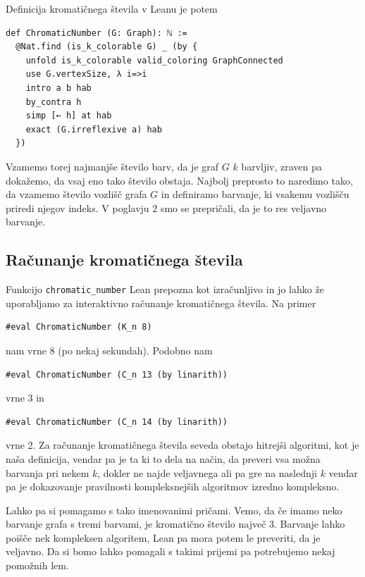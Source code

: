 \documentclass[mat1]{fmfdelo}
\begin{document}
Definicija kromatičnega števila v Leanu je potem
\begin{lstlisting}
def ChromaticNumber (G: Graph): ℕ :=
  @Nat.find (is_k_colorable G) _ (by {
    unfold is_k_colorable valid_coloring GraphConnected
    use G.vertexSize, λ i=>i
    intro a b hab
    by_contra h
    simp [← h] at hab
    exact (G.irreflexive a) hab
  })
\end{lstlisting}
Vzamemo torej najmanjše število barv, da je graf $G$ $k$ barvljiv, zraven pa dokažemo, da vsaj eno tako število obstaja.
Najbolj preprosto to naredimo tako, da vzamemo število vozlišč grafa $G$ in definiramo barvanje, ki vsakemu vozlišču priredi njegov indeks.
V poglavju 2 smo se prepričali, da je to res veljavno barvanje.

\subsection{Računanje kromatičnega števila}
Funkcijo \lstinline{chromatic_number} Lean prepozna kot izračunljivo in jo lahko že uporabljamo za interaktivno računanje
kromatičnega števila. Na primer
\begin{lstlisting}
#eval ChromaticNumber (K_n 8)
\end{lstlisting}
nam vrne 8 (po nekaj sekundah). Podobno nam
\begin{lstlisting}
#eval ChromaticNumber (C_n 13 (by linarith))
\end{lstlisting}
vrne 3 in
\begin{lstlisting}
#eval ChromaticNumber (C_n 14 (by linarith))
\end{lstlisting}
vrne 2. Za računanje kromatičnega števila seveda obstajo hitrejši algoritmi, kot je naša definicija, vendar pa je ta 
ki to dela na način, da preveri vsa možna barvanja pri nekem $k$, dokler ne najde veljavnega ali pa gre 
na naslednji $k$ vendar pa je dokazovanje pravilnosti kompleksnejših algoritmov izredno kompleksno.

Lahko pa si pomagamo s tako imenovanimi pričami. Vemo, da če imamo neko barvanje grafa s tremi barvami, je kromatično število največ 3. 
Barvanje lahko poišče nek kompleksen algoritem, Lean pa mora potem le preveriti, da je veljavno. Da si bomo lahko pomagali s takimi
prijemi pa potrebujemo nekaj pomožnih lem. 
\end{document}
